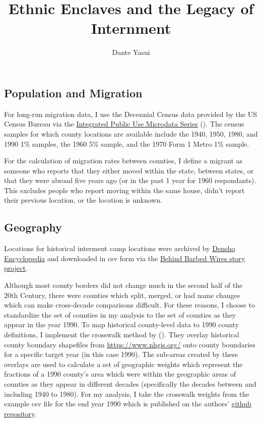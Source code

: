 \documentclass[
]{article}
\title{Ethnic Enclaves and the Legacy of Internment}
\author{Dante Yasui}
\date{}
\begin{document}
\maketitle

\subsection{Population and Migration}\label{population-and-migration}

For long-run migration data, I use the Decennial Census data provided by
the US Census Bureau via the
\href{https://usa.ipums.org/usa/index.shtml}{Integrated Public Use
Microdata Series} (). The census samples for which county locations are
available include the 1940, 1950, 1980, and 1990 1\% samples, the 1960
5\% sample, and the 1970 Form 1 Metro 1\% sample.

For the calculation of migration rates between counties, I define a
migrant as someone who reports that they either moved within the state,
between states, or that they were abroad five years ago (or in the past
1 year for 1960 respondants). This excludes people who report moving
within the same house, didn't report their previous location, or the
location is unknown.

\subsection{Geography}\label{geography}

Locations for historical interment camp locations were archived by
\href{http://encyclopedia.densho.org/War_Relocation_Authority/\#Planning_the_Camps}{Densho
Encyclopedia} and downloaded in csv form via the
\href{https://www.arcgis.com/home/item.html?id=69183af8d45d4f46a9dc4eba99440891}{Behind
Barbed Wires story project}.

Although most county borders did not change much in the second half of
the 20th Century, there were counties which split, merged, or had name
changes which can make cross-decade comparisons difficult. For these
reasons, I choose to standardize the set of counties in my analysis to
the set of counties as they appear in the year 1990. To map historical
county-level data to 1990 county definitions, I implement the crosswalk
method by (). They
overlay historical county boundary shapefiles from
\href{NHGIS}{https://www.nhgis.org/} onto county boundaries for a
specific target year (in this case 1990). The sub-areas created by these
overlays are used to calculate a set of geographic weights which
represent the fractions of a 1990 county's area which were within the
geographic areas of counties as they appear in different decades
(specifically the decades between and including 1940 to 1980). For my
analysis, I take the crosswalk weights from the example csv file for the
end year 1990 which is published on the authors'
\href{https://github.com/liang-jack-a/EGLP_Crosswalk/tree/master}{github
repository}.
\end{document}
